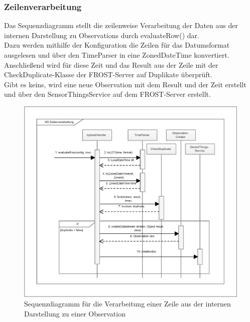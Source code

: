 \subsubsection{Zeilenverarbeitung}\label{verarbeitung}

Das Sequenzdiagramm stellt die zeilenweise Verarbeitung der Daten aus der internen Darstellung zu Observations durch evaluateRow() dar.\\
Dazu werden mithilfe der Konfiguration die Zeilen für das Datumsformat ausgelesen und über den TimeParser in eine ZonedDateTime konvertiert.\\
Anschließend wird für diese Zeit und das Result aus der Zeile mit der CheckDuplicate-Klasse der FROST-Server auf Duplikate überprüft.\\
Gibt es keins, wird eine neue Observation mit dem Result und der Zeit erstellt und über den SensorThingsService auf dem FROST-Server erstellt.

\vspace{\fill}
\begin{figure}[htbp]
\centering
\includegraphics[scale=0.6]{uml/eps/SD_row.eps}
\caption{Sequenzdiagramm für die Verarbeitung einer Zeile aus der internen Darstellung zu einer Observation}
\end{figure}
\vspace{\fill}

\clearpage
